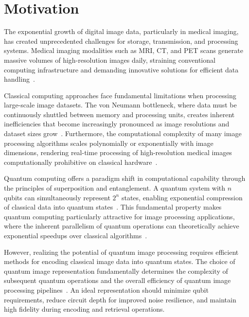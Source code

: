 \documentclass{ipol}
\begin{document}

\section{Motivation}\label{sec:motivation}

The exponential growth of digital image data, particularly in medical imaging, has created unprecedented challenges for storage, transmission, and processing systems. Medical imaging modalities such as MRI, CT, and PET scans generate massive volumes of high-resolution images daily, straining conventional computing infrastructure and demanding innovative solutions for efficient data handling~\cite{bib43}.

Classical computing approaches face fundamental limitations when processing large-scale image datasets. The von Neumann bottleneck, where data must be continuously shuttled between memory and processing units, creates inherent inefficiencies that become increasingly pronounced as image resolutions and dataset sizes grow~\cite{bib44}. Furthermore, the computational complexity of many image processing algorithms scales polynomially or exponentially with image dimensions, rendering real-time processing of high-resolution medical images computationally prohibitive on classical hardware~\cite{bib45}.

Quantum computing offers a paradigm shift in computational capability through the principles of superposition and entanglement. A quantum system with $n$ qubits can simultaneously represent $2^n$ states, enabling exponential compression of classical data into quantum states~\cite{bib2}. This fundamental property makes quantum computing particularly attractive for image processing applications, where the inherent parallelism of quantum operations can theoretically achieve exponential speedups over classical algorithms~\cite{bib12}.

However, realizing the potential of quantum image processing requires efficient methods for encoding classical image data into quantum states. The choice of quantum image representation fundamentally determines the complexity of subsequent quantum operations and the overall efficiency of quantum image processing pipelines~\cite{bib14}. An ideal representation should minimize qubit requirements, reduce circuit depth for improved noise resilience, and maintain high fidelity during encoding and retrieval operations.
\end{document}
